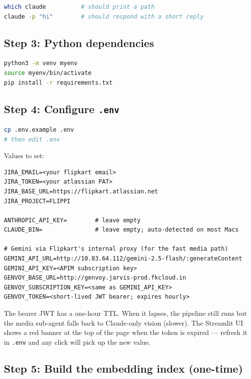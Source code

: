 \documentclass[11pt,a4paper]{article}
\begin{document}
\begin{lstlisting}[language=bash]
which claude          # should print a path
claude -p "hi"        # should respond with a short reply
\end{lstlisting}

\subsection{Step 3: Python dependencies}

\begin{lstlisting}[language=bash]
python3 -m venv myenv
source myenv/bin/activate
pip install -r requirements.txt
\end{lstlisting}

\subsection{Step 4: Configure \texttt{.env}}

\begin{lstlisting}[language=bash]
cp .env.example .env
# then edit .env
\end{lstlisting}

Values to set:

\begin{lstlisting}
JIRA_EMAIL=<your flipkart email>
JIRA_TOKEN=<your atlassian PAT>
JIRA_BASE_URL=https://flipkart.atlassian.net
JIRA_PROJECT=FLIPPI

ANTHROPIC_API_KEY=        # leave empty
CLAUDE_BIN=               # leave empty; auto-detected on most Macs

# Gemini via Flipkart's internal proxy (for the fast media path)
GEMINI_API_URL=http://10.83.64.112/gemini-2.5-flash/:generateContent
GEMINI_API_KEY=<APIM subscription key>
GENVOY_BASE_URL=http://genvoy.jarvis-prod.fkcloud.in
GENVOY_SUBSCRIPTION_KEY=<same as GEMINI_API_KEY>
GENVOY_TOKEN=<short-lived JWT bearer; expires hourly>
\end{lstlisting}

\begin{gotchabox}
The bearer JWT has a one-hour TTL. When it lapses, the pipeline still
runs but the media sub-agent falls back to Claude-only vision (slower).
The Streamlit UI shows a red banner at the top of the page when the
token is expired --- refresh it in \texttt{.env} and any click will pick
up the new value.
\end{gotchabox}

\subsection{Step 5: Build the embedding index (one-time)}
\end{document}
